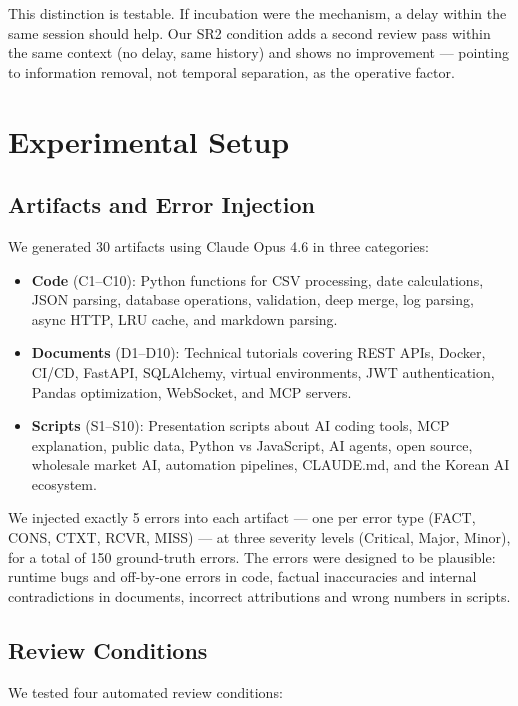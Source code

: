 \documentclass[11pt]{article}
\begin{document}
This distinction is testable. If incubation were the mechanism, a delay within the same session should help. Our SR2 condition adds a second review pass within the same context (no delay, same history) and shows no improvement --- pointing to information removal, not temporal separation, as the operative factor.

\section{Experimental Setup}

\subsection{Artifacts and Error Injection}

We generated 30 artifacts using Claude Opus 4.6 in three categories:

\begin{itemize}
\item \textbf{Code} (C1--C10): Python functions for CSV processing, date calculations, JSON parsing, database operations, validation, deep merge, log parsing, async HTTP, LRU cache, and markdown parsing.
\item \textbf{Documents} (D1--D10): Technical tutorials covering REST APIs, Docker, CI/CD, FastAPI, SQLAlchemy, virtual environments, JWT authentication, Pandas optimization, WebSocket, and MCP servers.
\item \textbf{Scripts} (S1--S10): Presentation scripts about AI coding tools, MCP explanation, public data, Python vs JavaScript, AI agents, open source, wholesale market AI, automation pipelines, CLAUDE.md, and the Korean AI ecosystem.
\end{itemize}

We injected exactly 5 errors into each artifact --- one per error type (FACT, CONS, CTXT, RCVR, MISS) --- at three severity levels (Critical, Major, Minor), for a total of 150 ground-truth errors. The errors were designed to be plausible: runtime bugs and off-by-one errors in code, factual inaccuracies and internal contradictions in documents, incorrect attributions and wrong numbers in scripts.

\subsection{Review Conditions}

We tested four automated review conditions:
\end{document}
